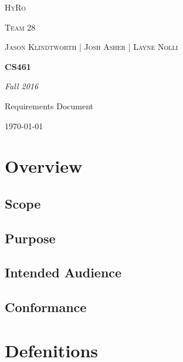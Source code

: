 \documentclass[10pt,draftclsnofoot,onecolumn,compsoc]{IEEEtran}
\begin{document}
\begin{titlepage}
	\centering
	{\scshape\LARGE HyRo \par}
	{\scshape\LARGE Team 28\par}
	\vspace{1cm}
	{\scshape\Large Jason Klindtworth  |  Josh Asher  |   Layne Nolli}
	\noindent\makebox[\linewidth]{\rule{17cm}{2pt}}
	\vspace{1cm}
	{\huge\bfseries CS461\par}
	\vspace{2cm}
	{\Large\itshape Fall 2016\par}
	\vspace{4cm}
	{\large Requirements Document\par}\vspace{8cm}
	\noindent\makebox[\linewidth]{\rule{17cm}{2pt}}
	\vfill

	{\large \today\par}
\end{titlepage}


\setcounter{tocdepth}{2}
\tableofcontents
\newpage

\section{ Overview}
\subsection{Scope}
\subsection{Purpose}
\subsection{Intended Audience}
\subsection{Conformance}
\section{Defenitions}
\end{document}
